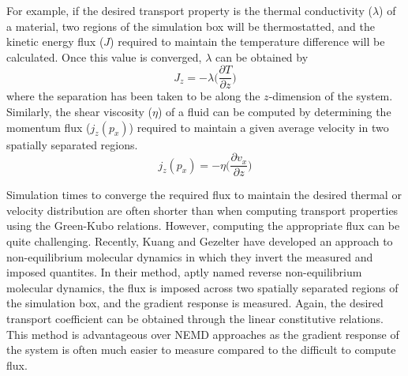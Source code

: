 For example, if the desired transport property is the thermal conductivity
($\lambda$) of a material, two regions of the simulation box will be
thermostatted, and the kinetic energy flux ($J$) required to maintain
the temperature difference will be calculated. Once this value is
converged, $\lambda$ can be obtained by
\begin{equation}\label{thermalTransport}
J_{z} = - \lambda \big(\frac{\partial T}{\partial z}\big)
\end{equation}
where the separation has been taken to be along the $z$-dimension of
the system.  Similarly, the shear viscosity ($\eta$) of a fluid can be
computed by determining the momentum flux ($ j_{z}(p_{x})$) required
to maintain a given average velocity in two spatially separated
regions. 
\begin{equation}\label{momentumTransport}
  j_{z}(p_{x}) = -\eta \big(\frac{\partial v_{x}}{\partial z}\big)
\end{equation}

Simulation times to converge the required flux to maintain the desired
thermal or velocity distribution are often shorter than when computing
transport properties using the Green-Kubo relations. However,
computing the appropriate flux can be quite challenging. Recently,
Kuang and Gezelter have developed an approach to non-equilibrium
molecular dynamics in which they invert the measured and imposed
quantites.\cite{Kuang2010,Kuang2012} In their method, aptly named
reverse non-equilibrium molecular dynamics, the flux is imposed across
two spatially separated regions of the simulation box, and the
gradient response is measured. Again, the desired transport
coefficient can be obtained through the linear constitutive
relations. This method is advantageous over NEMD approaches as the
gradient response of the system is often much easier to measure
compared to the difficult to compute flux.


